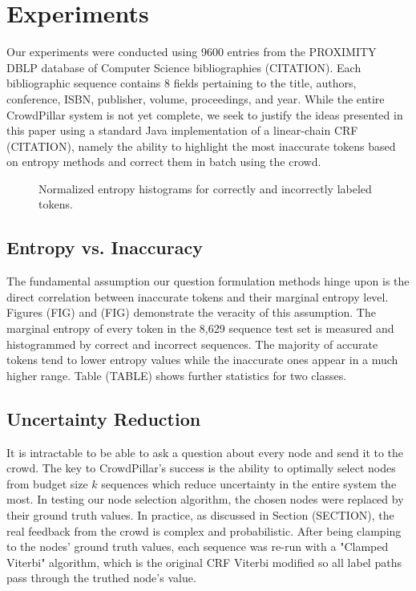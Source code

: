 \section{Experiments}
Our experiments were conducted using 9600 entries from the PROXIMITY DBLP database of Computer Science bibliographies (CITATION).  Each bibliographic sequence contains 8 fields pertaining to the title, authors, conference, ISBN, publisher, volume, proceedings, and year.  While the entire CrowdPillar system is not yet complete, we seek to justify the ideas presented in this paper using a standard Java implementation of a linear-chain CRF (CITATION), namely the ability to highlight the most inaccurate tokens based on entropy methods and correct them in batch using the crowd.

\begin{figure}
\centering
{}
\caption[example] {Normalized entropy histograms for correctly and incorrectly labeled tokens.}
\end{figure} 


\subsection{Entropy vs. Inaccuracy}
The fundamental assumption our question formulation methods hinge upon is the direct correlation between inaccurate tokens and their marginal entropy level.  Figures (FIG) and (FIG) demonstrate the veracity of this assumption.  The marginal entropy of every token in the 8,629 sequence test set is measured and histogrammed by correct and incorrect sequences. The majority of accurate tokens tend to lower entropy values while the inaccurate ones appear in a much higher range.  Table (TABLE) shows further statistics for two classes.

\subsection{Uncertainty Reduction}
It is intractable to be able to ask a question about every node and send it to the crowd.  The key to CrowdPillar's success is the ability to optimally select nodes from budget size $k$ sequences which reduce uncertainty in the entire system the most.  In testing our node selection algorithm, the chosen nodes were replaced by their ground truth values.  In practice, as discussed in Section (SECTION), the real feedback from the crowd is complex and probabilistic.  After being clamping to the nodes' ground truth values, each sequence was re-run with a "Clamped Viterbi" algorithm, which is the original CRF Viterbi modified so all label paths pass through the truthed node's value.

